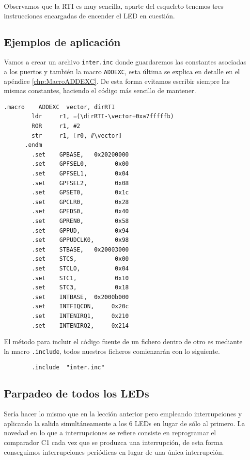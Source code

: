 Observamos que la RTI es muy sencilla, aparte del esqueleto tenemos tres instrucciones
encargadas de encender el LED en cuestión.

\subsection{Ejemplos de aplicación}

Vamos a crear un archivo {\tt inter.inc} donde guardaremos las constantes
asociadas a los puertos y también la macro {\tt ADDEXC}, esta última
se explica en detalle en el apéndice \ref{chp:MacroADDEXC}. De esta forma evitamos escribir
siempre las mismas constantes, haciendo el código más sencillo de mantener.

\begin{lstlisting}[caption={inter.inc},label={lst:codigoPract5_0}]
      .macro    ADDEXC  vector, dirRTI
        ldr     r1, =(\dirRTI-\vector+0xa7fffffb)
        ROR     r1, #2
        str     r1, [r0, #\vector]
      .endm
        .set    GPBASE,   0x20200000
        .set    GPFSEL0,        0x00
        .set    GPFSEL1,        0x04
        .set    GPFSEL2,        0x08
        .set    GPSET0,         0x1c
        .set    GPCLR0,         0x28
        .set    GPEDS0,         0x40
        .set    GPREN0,         0x58
        .set    GPPUD,          0x94
        .set    GPPUDCLK0,      0x98
        .set    STBASE,   0x20003000
        .set    STCS,           0x00
        .set    STCLO,          0x04
        .set    STC1,           0x10
        .set    STC3,           0x18
        .set    INTBASE,  0x2000b000
        .set    INTFIQCON,     0x20c
        .set    INTENIRQ1,     0x210
        .set    INTENIRQ2,     0x214
\end{lstlisting}

El método para incluir el código fuente de un fichero dentro de otro es mediante
la macro {\tt .include}, todos nuestros ficheros comienzarán con lo siguiente.

\begin{lstlisting}
        .include  "inter.inc"
\end{lstlisting}

\subsection{Parpadeo de todos los LEDs}

Sería hacer lo mismo que en la lección anterior pero empleando interrupciones y aplicando
la salida simultáneamente a los 6 LEDs en lugar de sólo al primero. La novedad en lo
que a interrupciones se refiere consiste en reprogramar el comparador C1 cada vez que
se produzca una interrupción, de esta forma conseguimos interrupciones periódicas en lugar
de una única interrupción.

